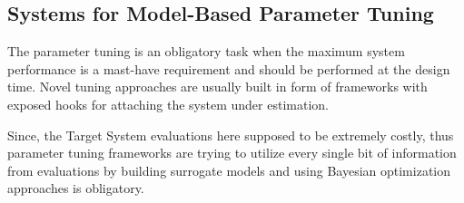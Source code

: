 \subsection{Systems for Model-Based Parameter Tuning}\label{bg: parameter tuning expamples}
The parameter tuning is an obligatory task when the maximum system performance is a mast-have requirement and should be performed at the design time.
Novel tuning approaches are usually built in form of frameworks with exposed hooks for attaching the system under estimation.

Since, the Target System evaluations here supposed to be extremely costly, thus parameter tuning frameworks are trying to utilize every single bit of information from evaluations by building surrogate models and using Bayesian optimization approaches is obligatory.


